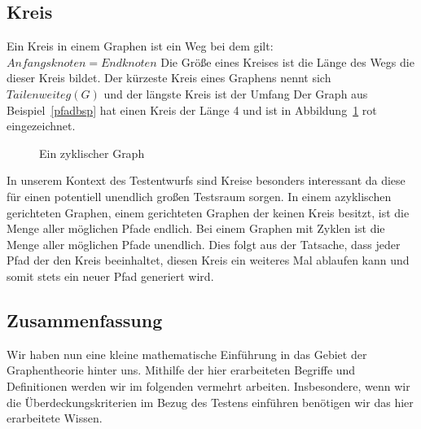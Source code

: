 \subsection{Kreis}

Ein Kreis in einem Graphen ist ein Weg bei dem gilt: $Anfangsknoten = Endknoten$ \cite[vgl. S. 8]{graphentheorie}
Die Größe eines Kreises ist die Länge des Wegs die dieser Kreis bildet.
Der kürzeste Kreis eines Graphens nennt sich $Tailenweite g(G)$ und der längste Kreis ist der Umfang \cite[vgl. S.8]{graphentheorie}
Der Graph aus Beispiel~\ref{pfadbsp} hat einen Kreis der Länge 4 und ist in Abbildung~\ref{zyklgraph} rot eingezeichnet.

\begin{figure}[h!]
    \centering
    \label{zyklgraph}
    \caption{Ein zyklischer Graph}
\end{figure}
In unserem Kontext des Testentwurfs sind Kreise besonders interessant da diese für einen potentiell unendlich großen Testsraum sorgen.
In einem azyklischen gerichteten Graphen, einem gerichteten Graphen der keinen Kreis besitzt, ist die Menge aller möglichen Pfade endlich.
Bei einem Graphen mit Zyklen ist die Menge aller möglichen Pfade unendlich.
Dies folgt aus der Tatsache, dass jeder Pfad der den Kreis beeinhaltet, diesen Kreis ein weiteres Mal ablaufen kann
und somit stets ein neuer Pfad generiert wird.

\subsection{Zusammenfassung}
Wir haben nun eine kleine mathematische Einführung in das Gebiet der Graphentheorie hinter uns.
Mithilfe der hier erarbeiteten Begriffe und Definitionen werden wir im folgenden vermehrt arbeiten.
Insbesondere, wenn wir die Überdeckungskriterien im Bezug des Testens einführen benötigen wir das hier erarbeitete Wissen.
